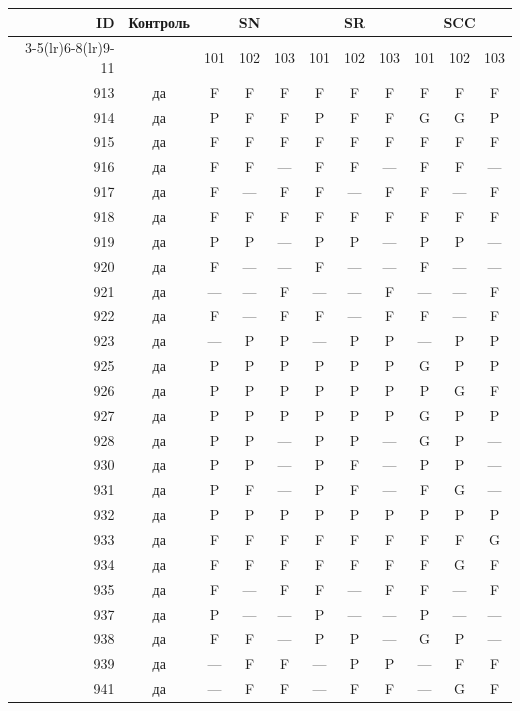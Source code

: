 \begin{table}[p]\centering\small
\begin{tabular*}{\textwidth}{@{\extracolsep{\fill}}rc*{9}{c}@{}}\toprule
ID & Контроль & \multicolumn{3}{c}{SN} & \multicolumn{3}{c}{SR} & \multicolumn{3}{c}{SCC}\\
\cmidrule(lr){3-5}\cmidrule(lr){6-8}\cmidrule(lr){9-11}
 & & 101 & 102 & 103 & 101 & 102 & 103 & 101 & 102 & 103\\\midrule
913 & да & F & F & F & F & F & F & F & F & F\\
914 & да & P & F & F & P & F & F & G & G & P\\
915 & да & F & F & F & F & F & F & F & F & F\\
916 & да & F & F & — & F & F & — & F & F & —\\
917 & да & F & — & F & F & — & F & F & — & F\\
918 & да & F & F & F & F & F & F & F & F & F\\
919 & да & P & P & — & P & P & — & P & P & —\\
920 & да & F & — & — & F & — & — & F & — & —\\
921 & да & — & — & F & — & — & F & — & — & F\\
922 & да & F & — & F & F & — & F & F & — & F\\
923 & да & — & P & P & — & P & P & — & P & P\\
925 & да & P & P & P & P & P & P & G & P & P\\
926 & да & P & P & P & P & P & P & P & G & F\\
927 & да & P & P & P & P & P & P & G & P & P\\
928 & да & P & P & — & P & P & — & G & P & —\\
930 & да & P & P & — & P & F & — & P & P & —\\
931 & да & P & F & — & P & F & — & F & G & —\\
932 & да & P & P & P & P & P & P & P & P & P\\
933 & да & F & F & F & F & F & F & F & F & G\\
934 & да & F & F & F & F & F & F & F & G & F\\
935 & да & F & — & F & F & — & F & F & — & F\\
937 & да & P & — & — & P & — & — & P & — & —\\
938 & да & F & F & — & P & P & — & G & P & —\\
939 & да & — & F & F & — & P & P & — & F & F\\
941 & да & — & F & F & — & F & F & — & G & F\\

\end{tabular*}
\end{table}
